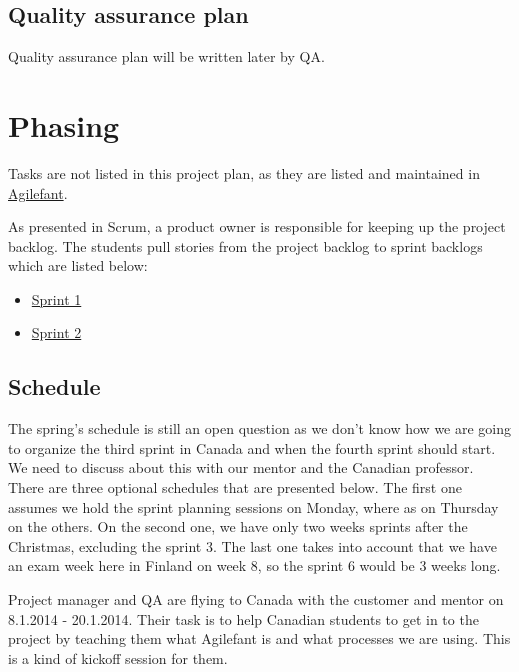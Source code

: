 \subsection{Quality assurance plan}

Quality assurance plan will be written later by QA.

\section{Phasing}

Tasks are not listed in this project plan, as they are listed and maintained in 
\href{https://cloud.agilefant.com/dev/}{Agilefant}.

As presented in Scrum, a product owner is responsible for keeping up the
project backlog. The students pull stories from the project backlog to sprint
backlogs which are listed below:

\begin{itemize}
  \item
  \href{https://cloud.agilefant.com/dev/ROIteration.action?readonlyToken=656371244996018241588558287820343266020}{Sprint
  1}
  \item
  \href{https://cloud.agilefant.com/dev/ROIteration.action?readonlyToken=807072238002616723743205864538724805102}{Sprint
  2}
\end{itemize}

\subsection{Schedule}

The spring's schedule is still an open question as we don't know how we are
going to organize the third sprint in Canada and when the fourth sprint should
start. We need to discuss about this with our mentor and the Canadian professor.
There are three optional schedules that are presented below. The first one
assumes we hold the sprint planning sessions on Monday, where as on Thursday on
the others. On the second one, we have only two weeks sprints after the
Christmas, excluding the sprint 3. The last one takes into account that we have
an exam week here in Finland on week 8, so the sprint 6 would be 3 weeks long.

Project manager and QA are flying to Canada with the customer and mentor on
8.1.2014 - 20.1.2014. Their task is to help Canadian students to get in to the
project by teaching them what Agilefant is and what processes we are using. This
is a kind of kickoff session for them.

